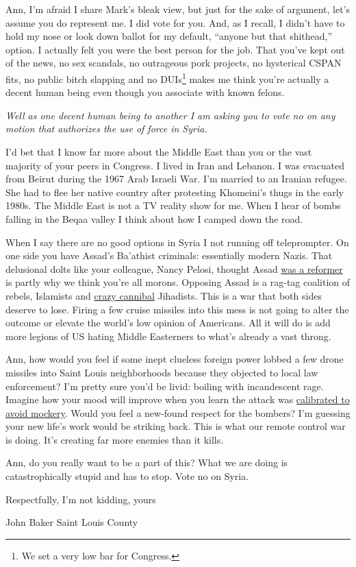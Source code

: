 Ann, I'm afraid I share Mark's bleak view, but just for the sake of
argument, let's assume you do represent me. I did vote for you. And, as
I recall, I didn't have to hold my nose or look down ballot for my
default, ``anyone but that shithead,'' option. I actually felt you were
the best person for the job. That you've kept out of the news, no sex
scandals, no outrageous pork projects, no hysterical CSPAN fits, no
public bitch slapping and no DUIs\footnote{
We set a very low bar for Congress.
} makes me think you're actually a decent human being even though you
associate with known felons.

\medskip

\emph{Well as one decent human being to another I am asking you to vote
no on any motion that authorizes the use of force in Syria.}

\medskip

I'd bet that I know far more about the Middle East than you or the vast
majority of your peers in Congress. I lived in Iran and Lebanon. I was
evacuated from Beirut during the 1967 Arab Israeli War. I'm married to
an Iranian refugee. She had to flee her native country after protesting
Khomeini's thugs in the early 1980s. The Middle East is not a TV
reality show for me. When I hear of bombs falling in the Beqaa valley I
think about how I camped down the road.

When I say there are no good options in Syria I not running off
teleprompter. On one side you have Assad's Ba'athist criminals:
essentially modern Nazis. That delusional dolts like your colleague,
Nancy Pelosi, thought Assad
\href{http://www.nationalreview.com/articles/312450/assads-useful-idiots-noah-glyn}{was
a reformer} is partly why we think you're all morons. Opposing Assad is
a rag-tag coalition of rebels, Islamists and
\href{http://www.bbc.co.uk/news/magazine-23190533}{crazy cannibal}
Jihadists. This is a war that both sides deserve to lose. Firing a few
cruise missiles into this mess is not going to alter the outcome or
elevate the world's low opinion of Americans. All it will do is add more
legions of US hating Middle Easterners to what's already a vast throng.

Ann, how would you feel if some inept clueless foreign power lobbed a
few drone missiles into Saint Louis neighborhoods because they objected
to local law enforcement? I'm pretty sure you'd be livid: boiling with
incandescent rage. Imagine how your mood will improve when you learn the
attack was
\href{http://www.thedailybeast.com/articles/2013/08/31/is-obama-going-to-war-just-to-check-the-box.html}{calibrated
to avoid mockery}. Would you feel a new-found respect for the bombers?
I'm guessing your new life's work would be striking back. This is what
our remote control war is doing. It's creating far more enemies than it
kills.

Ann, do you really want to be a part of this? What we are doing is
catastrophically stupid and has to stop. Vote no on Syria.

\medskip

\noindent Respectfully, I'm not kidding, yours

\noindent John Baker Saint Louis County

%